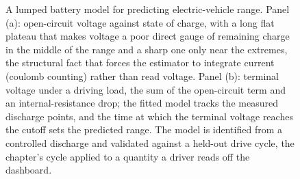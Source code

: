 \begin{figure}[htbp]
\begin{tikzpicture}[font=\small]
\end{tikzpicture}
\caption[A battery model for range estimation]{A lumped battery model for
predicting electric-vehicle range. Panel (a): open-circuit voltage against
state of charge, with a long flat plateau that makes voltage a poor direct
gauge of remaining charge in the middle of the range and a sharp one only
near the extremes, the structural fact that forces the estimator to
integrate current (coulomb counting) rather than read voltage. Panel (b):
terminal voltage under a driving load, the sum of the open-circuit term
and an internal-resistance drop; the fitted model tracks the measured
discharge points, and the time at which the terminal voltage reaches the
cutoff sets the predicted range. The model is identified from a
controlled discharge and validated against a held-out drive cycle, the
chapter's cycle applied to a quantity a driver reads off the dashboard.}
\label{fig:vol02ch18:battery-soc}
\end{figure}

